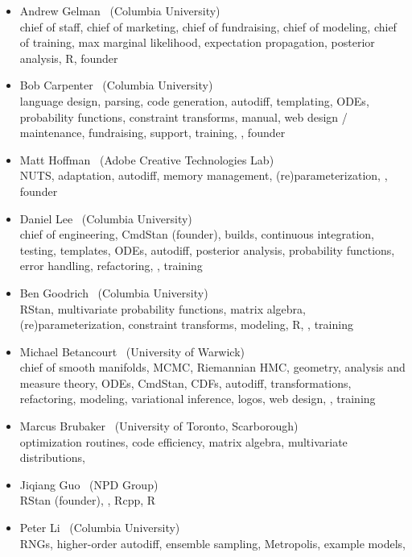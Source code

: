 \begin{itemize}
\item Andrew Gelman \ (Columbia University)
\\ {\footnotesize chief of staff, chief of marketing, chief of
  fundraising, chief of modeling, chief of training, max marginal
  likelihood, expectation propagation, posterior analysis, R, founder}
\item Bob Carpenter \ (Columbia University) \\ {\footnotesize language
    design, parsing, code generation, autodiff, templating, ODEs,
    probability functions, constraint transforms, manual, web design /
    maintenance, fundraising, support, training, \Cpp, founder}
\item Matt Hoffman \ (Adobe Creative Technologies Lab)
\\ {\footnotesize NUTS, adaptation, autodiff, memory management,
  (re)parameterization, \Cpp, founder}
\item Daniel Lee \   (Columbia University)
\\ {\footnotesize chief of engineering, CmdStan (founder), builds, continuous
  integration, testing, templates, ODEs, autodiff,
  posterior analysis, probability functions, error handling,
  refactoring, \Cpp, training}
\item Ben Goodrich \   (Columbia University)
\\ {\footnotesize RStan, multivariate probability functions, matrix algebra,
  (re)parameterization, constraint transforms, modeling, R, \Cpp, training}
\item Michael Betancourt \ (University of Warwick) \\
  {\footnotesize chief of smooth manifolds, MCMC, Riemannian HMC,
    geometry, analysis and measure theory, ODEs, CmdStan, CDFs,
    autodiff, transformations, refactoring, modeling, variational
    inference, logos, web design, \Cpp, training}
\item Marcus Brubaker \   (University of Toronto, Scarborough)
\\ {\footnotesize optimization routines, code efficiency, matrix
  algebra, multivariate distributions, \Cpp}
\item Jiqiang Guo \   (NPD Group)
\\ {\footnotesize RStan (founder), \Cpp, Rcpp, R}
\item Peter Li \   (Columbia University)
\\ {\footnotesize RNGs, higher-order autodiff, ensemble sampling,
  Metropolis, example models, \Cpp}

\end{itemize}
